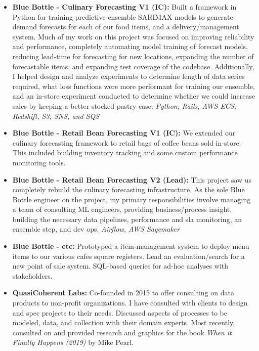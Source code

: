 \documentclass[a4paper,10pt,notitlepage]{article}
\begin{document}
    \begin{itemize}
        \vspace{-5pt}\item \textbf{Blue Bottle - Culinary Forecasting V1 (IC):} Built a framework in Python for training predictive ensemble SARIMAX models to generate demand forecasts for each of our food items, and a delivery/management system. Much of my work on this project was focused on improving reliability and performance, completely automating model training of forecast models, reducing lead-time for forecasting for new locations, expanding the number of forecastable items, and expanding test coverage of the codebase. Additionally, I helped design and analyze experiments to determine length of data series required, what loss functions were more performant for training our ensemble, and an in-store experiment conducted to determine whether we could increase sales by keeping a better stocked pastry case. \emph{Python, Rails, AWS ECS, Redshift, S3, SNS, and SQS}
        \vspace{-5pt}\item \textbf{Blue Bottle - Retail Bean Forecasting V1 (IC):} We extended our culinary forecasting framework to retail bags of coffee beans sold in-store. This included building inventory tracking and some custom performance monitoring tools.
        \vspace{-5pt}\item \textbf{Blue Bottle - Retail Bean Forecasting V2 (Lead):} This project saw us completely rebuild the culinary forecasting infrastructure. As the sole Blue Bottle engineer on the project, my primary responsibilities involve managing a team of consulting ML engineers, providing business/process insight, building the necessary data pipelines, performance and sla monitoring, an ensemble step, and dev ops. \emph{Airflow, AWS Sagemaker}
        \vspace{-5pt}\item \textbf{Blue Bottle - etc:} Prototyped a item-management system to deploy menu items to our various cafes square registers. Lead an evaluation/search for a new point of sale system. SQL-based queries for ad-hoc analyses with stakeholders.
        \vspace{-5pt}\item \textbf{QuasiCoherent Labs:} Co-founded in 2015 to offer consulting on data products to non-profit organizations. I have consulted with clients to design and spec projects to their needs. Discussed aspects of processes to be modeled, data, and collection with their domain experts. Most recently, consulted on and provided research and graphics for the book \emph{When it Finally Happens (2019)} by Mike Pearl.

\end{itemize}
\end{document}
